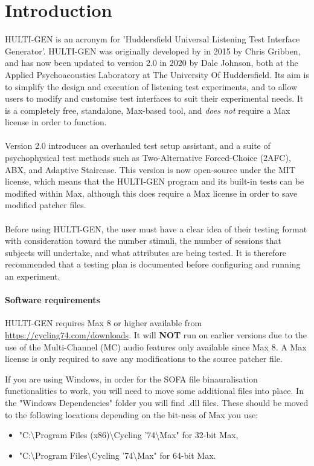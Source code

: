 \chapter{Introduction}
HULTI-GEN is an acronym for 'Huddersfield Universal Listening Test Interface Generator'. HULTI-GEN was originally developed by in 2015 by Chris Gribben, and has now been updated to version 2.0 in 2020 by Dale Johnson, both at the Applied Psychoacoustics Laboratory at The University Of Huddersfield. Its aim is to simplify the design and execution of listening test experiments, and to allow users to modify and customise test interfaces to suit their experimental needs. It is a completely free, standalone, Max-based tool, and \emph{does not} require a Max license in order to function. 
\\
\\
Version 2.0 introduces an overhauled test setup assistant, and a suite of psychophysical test methods such as Two-Alternative Forced-Choice (2AFC), ABX, and Adaptive Staircase. This version is now open-source under the MIT license, which means that the HULTI-GEN program and its built-in tests can be modified within Max, although this does require a Max license in order to save modified patcher files.
\\
\\
Before using HULTI-GEN, the user must have a clear idea of their testing format with consideration toward the number stimuli, the number of sessions that subjects will undertake, and what attributes are being tested. It is therefore recommended that a testing plan is documented before configuring and running an experiment.
\subsubsection{Software requirements}
HULTI-GEN requires Max 8 or higher available from \href{https://cycling74.com/downloads}{https://cycling74.com/downloads}. It will \textbf{NOT} run on earlier versions due to the use of the Multi-Channel (MC) audio features only available since Max 8. A Max license is only required to save any modifications to the source patcher file.

If you are using Windows, in order for the SOFA file binauralisation functionalities to work, you will need to move some additional files into place. In the "Windows Dependencies" folder you will find .dll files. These should be moved to the following locations depending on the bit-ness of Max you use:
\begin{itemize}
    \item "C:\textbackslash Program Files (x86)\textbackslash Cycling '74\textbackslash Max" for 32-bit Max,
    \item "C:\textbackslash Program Files\textbackslash Cycling '74\textbackslash Max" for 64-bit Max.
\end{itemize}

